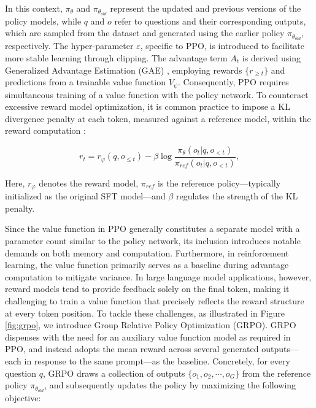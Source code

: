 \begin{itemize}[topsep=0pt]
In this context, $\pi_{\theta}$ and $\pi_{\theta_{old}}$ represent the updated and previous versions of the policy models, while $q$ and $o$ refer to questions and their corresponding outputs, which are sampled from the dataset and generated using the earlier policy $\pi_{\theta_{old}}$, respectively. The hyper-parameter $\varepsilon$, specific to PPO, is introduced to facilitate more stable learning through clipping. The advantage term $A_t$ is derived using Generalized Advantage Estimation (GAE) \citep{gae}, employing rewards $\{r_{\ge t}\}$ and predictions from a trainable value function $V_{\psi}$. Consequently, PPO requires simultaneous training of a value function with the policy network. To counteract excessive reward model optimization, it is common practice to impose a KL divergence penalty at each token, measured against a reference model, within the reward computation \citep{ouyang2022training}:

\begin{equation}
    r_{t} = r_\varphi(q, o_{\le t}) - \beta \log\frac{\pi_{\theta}(o_{t}|q, o_{<t})}{\pi_{ref}(o_{t}|q, o_{<t})},
\label{eq:PPO-reward}
\end{equation}

Here, $r_\varphi$ denotes the reward model, $\pi_{ref}$ is the reference policy—typically initialized as the original SFT model—and $\beta$ regulates the strength of the KL penalty.

Since the value function in PPO generally constitutes a separate model with a parameter count similar to the policy network, its inclusion introduces notable demands on both memory and computation. Furthermore, in reinforcement learning, the value function primarily serves as a baseline during advantage computation to mitigate variance. In large language model applications, however, reward models tend to provide feedback solely on the final token, making it challenging to train a value function that precisely reflects the reward structure at every token position. To tackle these challenges, as illustrated in Figure \ref{fig:grpo}, we introduce Group Relative Policy Optimization (GRPO). GRPO dispenses with the need for an auxiliary value function model as required in PPO, and instead adopts the mean reward across several generated outputs—each in response to the same prompt—as the baseline. Concretely, for every question $q$, GRPO draws a collection of outputs $\{o_1, o_2, \cdots, o_G\}$ from the reference policy $\pi_{\theta_{old}}$, and subsequently updates the policy by maximizing the following objective:


\end{itemize}
